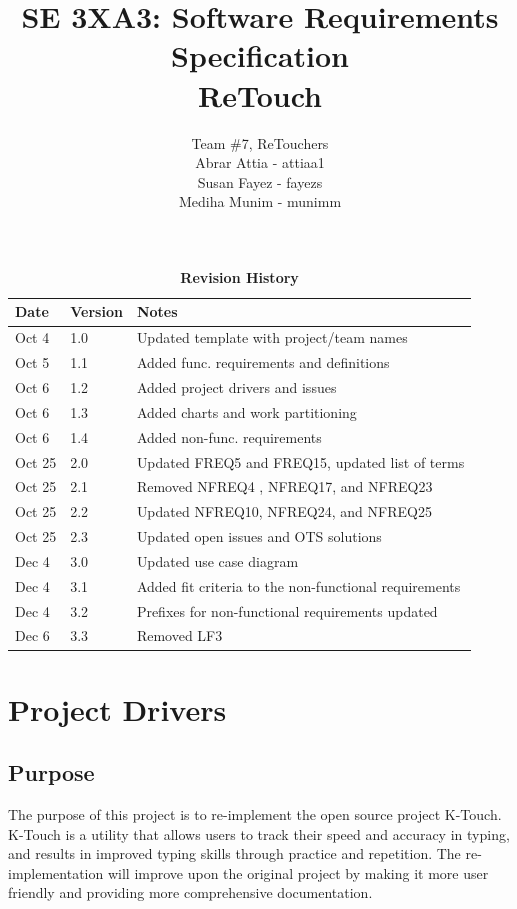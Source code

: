 \documentclass[12pt, titlepage]{article}
\title{SE 3XA3: Software Requirements Specification\\ReTouch}
\author{Team \#7, ReTouchers
		\\ Abrar Attia - attiaa1
		\\ Susan Fayez - fayezs
		\\ Mediha Munim - munimm
}
\begin{document}
\maketitle

\tableofcontents
\listoftables
\listoffigures

\begin{table}[bp]
\caption{\bf Revision History}
\begin{tabularx}{\textwidth}{p{3cm}p{2cm}X}
\toprule {\bf Date} & {\bf Version} & {\bf Notes}\\
\midrule
Oct 4 & 1.0 & Updated template with project/team names\\
Oct 5 & 1.1 & Added func. requirements and definitions \\
Oct 6 & 1.2 & Added project drivers and issues\\
Oct 6 & 1.3 & Added charts and work partitioning\\
Oct 6 & 1.4 & Added non-func. requirements \\
Oct 25 & 2.0 & Updated FREQ5 and FREQ15, updated list of terms \\
Oct 25 & 2.1 & Removed NFREQ4 , NFREQ17, and NFREQ23 \\
Oct 25 & 2.2 & Updated NFREQ10, NFREQ24, and NFREQ25\\
Oct 25 & 2.3 & Updated open issues and OTS solutions\\
Dec 4 & 3.0 & Updated use case diagram\\
Dec 4 & 3.1 & Added fit criteria to the non-functional requirements\\
Dec 4 & 3.2 & Prefixes for non-functional requirements updated\\
Dec 6 & 3.3 & Removed LF3\\

\bottomrule
\end{tabularx}
\end{table}

\newpage


\section{Project Drivers}
\subsection{Purpose}
\indent \indent The purpose of this project is to re-implement the open source project K-Touch. K-Touch is a utility that allows users to track their speed and accuracy in typing, and results in improved typing skills through practice and repetition. The re-implementation will improve upon the original project by making it more user friendly and providing more comprehensive documentation.
\end{document}
